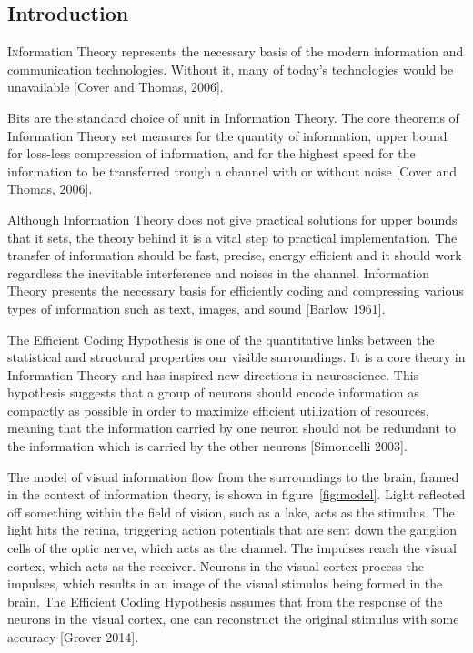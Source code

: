 \documentclass[twoside]{article}
\begin{document}
\begin{multicols}{2} %

\section{Introduction}

\lettrine[nindent=0em,lines=3]{I}nformation Theory represents the necessary basis of the modern information and communication technologies. Without it, many of today's technologies would be unavailable [Cover and Thomas, 2006].

Bits are the standard choice of unit in Information Theory. The core theorems of Information Theory set measures for the quantity of information, upper bound for loss-less compression of information, and for the highest speed for the information to be transferred trough a channel with or without noise [Cover and Thomas, 2006]. 

Although Information Theory does not give practical solutions for upper bounds that it sets, the theory behind it is a vital step to practical implementation. The transfer of information should be fast, precise, energy efficient and it should work regardless the inevitable interference and noises in the channel. Information Theory presents the necessary basis for efficiently coding and compressing various types of information such as text, images, and sound [Barlow 1961]. 

The Efficient Coding Hypothesis is one of the quantitative links between the statistical and structural properties our visible surroundings. It is a core theory in Information Theory and has inspired new directions in neuroscience. This hypothesis suggests that a group of neurons should encode information as compactly as possible in order to maximize efficient utilization of resources, meaning that the information carried by one neuron should not be redundant to the information which is carried by the other neurons [Simoncelli 2003]. 

The model of visual information flow from the surroundings to the brain, framed in the context of information theory, is shown in figure~\ref{fig:model}. Light reflected off something within the field of vision, such as a lake, acts as the stimulus. The light hits the retina, triggering action potentials that are sent down the ganglion cells of the optic nerve, which acts as the channel. The impulses reach the visual cortex, which acts as the receiver. Neurons in the visual cortex process the impulses, which results in an image of the visual stimulus being formed in the brain. The Efficient Coding Hypothesis assumes that from the response of the neurons in the visual cortex, one can reconstruct the original stimulus with some accuracy [Grover 2014]. 


\end{multicols}
\end{document}
